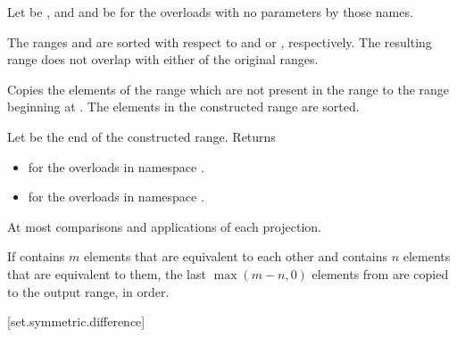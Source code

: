 \begin{itemdescr}
\pnum
Let  be ,
and  and  be 
for the overloads with no parameters by those names.

\pnum
\expects
The ranges  and  are sorted
with respect to  and  or , respectively.
The resulting range does not overlap with either of the original ranges.

\pnum
\effects
Copies the elements of the range 
which are not present in the range 
to the range beginning at .
The elements in the constructed range are sorted.

\pnum
\returns
Let  be the end of the constructed range.
Returns
\begin{itemize}
\item
  for the overloads in namespace .
\item
  for the overloads in namespace .
\end{itemize}

\pnum
\complexity
At most 
comparisons and applications of each projection.

\pnum
\remarks
If  contains $m$ elements
that are equivalent to each other and
 contains $n$ elements
that are equivalent to them,
the last $\max(m - n, 0)$ elements from 
are copied to the output range, in order.
\end{itemdescr}

[set.symmetric.difference]{}

